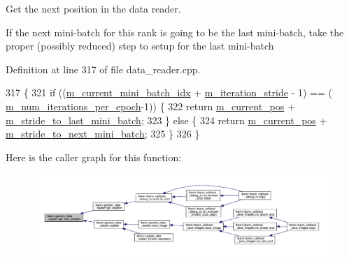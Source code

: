 Get the next position in the data reader. 

If the next mini-\/batch for this rank is going to be the last mini-\/batch, take the proper (possibly reduced) step to setup for the last mini-\/batch 

Definition at line 317 of file data\+\_\+reader.\+cpp.


\begin{DoxyCode}
317                                                  \{
321   \textcolor{keywordflow}{if} ((\hyperlink{classlbann_1_1generic__data__reader_aefd4bc0bf95de1e2500827581acf3536}{m\_current\_mini\_batch\_idx} + \hyperlink{classlbann_1_1generic__data__reader_a73b23a2e7768db4e9e8ba4d9a362163a}{m\_iteration\_stride} - 1) == (
      \hyperlink{classlbann_1_1generic__data__reader_ab570063483a1f604ca2fc536c3d83de7}{m\_num\_iterations\_per\_epoch}-1)) \{
322     \textcolor{keywordflow}{return} \hyperlink{classlbann_1_1generic__data__reader_a2facf4e410099ac8c1fa586e797ec2e0}{m\_current\_pos} + \hyperlink{classlbann_1_1generic__data__reader_ac46922f2ef4f392bcc7c59c21685a3ff}{m\_stride\_to\_last\_mini\_batch};
323   \} \textcolor{keywordflow}{else} \{
324     \textcolor{keywordflow}{return} \hyperlink{classlbann_1_1generic__data__reader_a2facf4e410099ac8c1fa586e797ec2e0}{m\_current\_pos} + \hyperlink{classlbann_1_1generic__data__reader_a02c4632cc7cad5c3e4062934c41717a0}{m\_stride\_to\_next\_mini\_batch};
325   \}
326 \}
\end{DoxyCode}
Here is the caller graph for this function\+:\nopagebreak
\begin{figure}[H]
\begin{center}
\leavevmode
\includegraphics[width=350pt]{classlbann_1_1generic__data__reader_ab11a9eca77ac9018bdab45ead7ef5e13_icgraph}
\end{center}
\end{figure}
\mbox{\label{classlbann_1_1generic__data__reader_adcdb833aff7ce85b0879334b252f357a}} 
